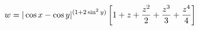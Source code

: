 $$ w=|\cos x - \cos y|^{(1+2\sin^2 y)}\left[1+z+{{z^2}\over 2}+{{z^3}\over 3}+{{z^4}\over 4}\right] $$
